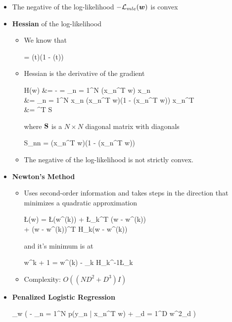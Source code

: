 \begin{itemize}
	\item The negative of the log-likelihood $- \mathcal{L}_{mle}(\bm w)$ is convex
	\item \textbf{Hessian} of the log-likelihood
	\begin{itemize}
		\item We know that
		\begin{myalign*}
		     = \sigma(t)(1 - \sigma(t))
		\end{myalign*}
		\item Hessian is the derivative of the gradient
		\begin{myalign*}
		    \*H(\bm w) &= -   = \sum_{n = 1}^N  \sigma(\bm x_n^T \bm w) \bm x_n\\
		    &= \sum_{n = 1}^N \bm x_n \sigma(\bm x_n^T \bm w)(1 - \sigma(\bm x_n^T \bm w)) \bm x_n^T\\
		    &= ^T \*S \tilde{\*X}
		\end{myalign*}
		where $\mathbf{S}$ is a $N \times N$ diagonal matrix with diagonals
		\begin{myalign*}
		    S_{nn} = \sigma(\bm x_n^T \bm w)(1 - \sigma(\bm x_n^T \bm w))
		\end{myalign*}
		\item The negative of the log-likelihood is not strictly convex.
	\end{itemize}
	\item \textbf{Newton's Method} %
	\begin{itemize}
		\item Uses second-order information and takes steps in the direction that minimizes a quadratic approximation
		\begin{myalign*}
		    \L(\bm w) = \L(\bm w^{(k)}) + \*\nabla\L_k^T (\bm w - \bm w^{(k)})\\ + (\bm w - \bm w^{(k)})^T \*H_k(\bm w - \bm w^{(k)})
		\end{myalign*}
		and it's minimum is at
		\begin{myalign*}
		    \bm w^{k + 1} = \bm w^{(k)} - \gamma_k \*H_k^{-1}\*\nabla\L_k
		\end{myalign*}
		\item Complexity: $O((ND^2 + D^3)I)$
	\end{itemize}
	\item \textbf{Penalized Logistic Regression}
	\begin{myalign*}
	    \min_{\bm w} 
	    \left(
	    	- \sum_{n = 1}^N \log p(y_n | \*x_n^T \bm w) + \lambda \sum_{d = 1}^D w^2_d
	    \right)
	\end{myalign*}
\end{itemize}

